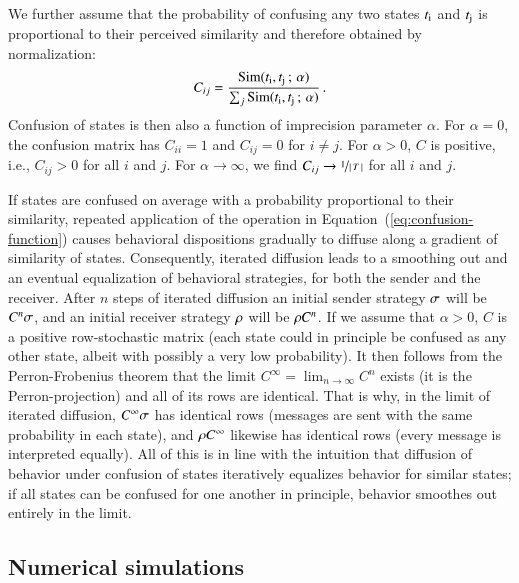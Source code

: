 \documentclass[fleqn,reqno,10pt]{article}
\newcommand{\imprecision}{\ensuremath{\alpha}} %
\newcommand{\similarity}{\ensuremath{\mathrm{Sim}}} %
\begin{document}
We further assume that the probability of confusing any two states
$t_{\mathrm{i}}$ and $t_{\mathrm{j}}$ is proportional to their perceived
similarity and therefore obtained by normalization:
\begin{align*}
  C_{ij} = \frac{\similarity(\mystate{i}, \mystate{j} \myts ; \myts
  \imprecision)} {\sum_j \similarity(\mystate{i}, \mystate{j} \myts ; \myts
  \imprecision)} \,.
\end{align*}
Confusion of states is then also a function of imprecision parameter
$\imprecision$. For $\imprecision = 0$, the confusion matrix has $C_{ii}
= 1$ and $C_{ij} = 0$ for $i \neq j$. For $\imprecision > 0$, $C$ is positive, i.e., $C_{ij} >0$ for
all $i$ and $j$. For $\imprecision \rightarrow \infty$, we find $C_{ij}
\rightarrow \nicefrac{1}{\left \lvert \, T \, \right\rvert}$ for all $i$ and $j$.

If states are confused on average with a probability proportional to
their similarity, repeated application of the operation in
Equation~(\ref{eq:confusion-function}) causes behavioral dispositions
gradually to diffuse along a gradient of similarity of
states. Consequently, iterated diffusion leads to a smoothing out and
an eventual equalization of behavioral strategies, for both the sender
and the receiver. After $n$ steps of iterated diffusion an initial
sender strategy $\sigma$ will be $C^n \sigma$, and an initial
receiver strategy $\rho$ will be $\rho C^n$. If we assume that
$\imprecision > 0$, $C$ is a positive row-stochastic matrix (each state
could in principle be confused as any other state, albeit with
possibly a very low probability). It then follows from the
Perron-Frobenius theorem that the limit $C^\infty = \lim_{n
  \rightarrow \infty} C^n$ exists (it is the Perron-projection) and
all of its rows are identical. That is why, in the limit of iterated
diffusion, $C^\infty \sigma$ has identical rows (messages are sent
with the same probability in each state), and $\rho C^\infty$
likewise has identical rows (every message is interpreted
equally). All of this is in line with the intuition that diffusion of
behavior under confusion of states iteratively equalizes behavior for
similar states; if all states can be confused for one another in
principle, behavior smoothes out entirely in the limit.

\subsection{Numerical simulations}
\label{sec:simulations}
\end{document}
